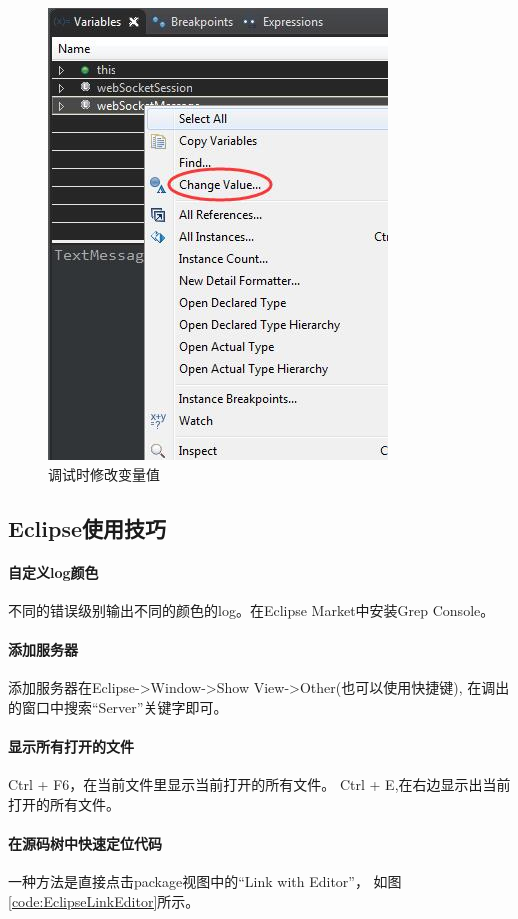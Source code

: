 \documentclass{book}
\begin{document}
\begin{figure}[htbp]
	\centering
	\includegraphics[scale=0.5]{ChangeVariableValueWhenDebug.jpg}
	\caption{调试时修改变量值}
	\label{code:ChangeVariableValueWhenDebug}
\end{figure}

\subsection{Eclipse使用技巧}

\paragraph{自定义log颜色}
不同的错误级别输出不同的颜色的log。在Eclipse Market中安装Grep Console。

\paragraph{添加服务器}
添加服务器在Eclipse->Window->Show View->Other(也可以使用快捷键),
在调出的窗口中搜索“Server”关键字即可。

\paragraph{显示所有打开的文件}
Ctrl + F6，在当前文件里显示当前打开的所有文件。
Ctrl + E,在右边显示出当前打开的所有文件。

\paragraph{在源码树中快速定位代码}
一种方法是直接点击package视图中的“Link with Editor”，
如图\ref{code:EclipseLinkEditor}所示。
\end{document}
